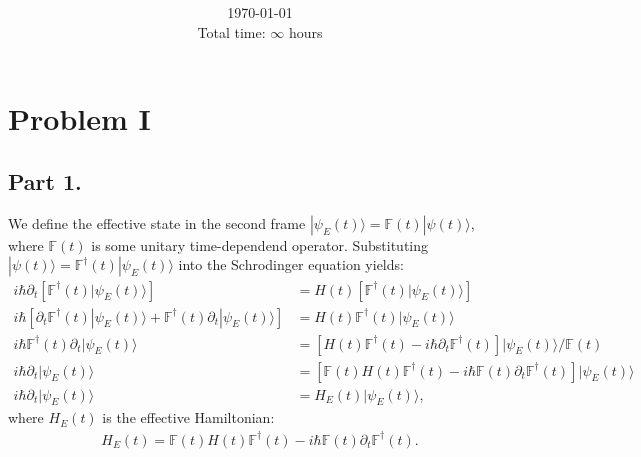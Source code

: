 \documentclass[letterpaper,11pt,twoside]{article}
\title{\textbf{\assignment}\\\course\\{\Large\institution}}
\author{\autor}
\date{\today\\Total time: $\infty$ hours}
\newcommand{\ket}[1]{|#1\rangle}
\begin{document}
\pagestyle{mainstyle}
\maketitle
\section*{Problem I}
%
\subsection*{Part 1.}
We define the effective state in the second frame $\ket{\psi_E(t)}=\mathbb{F}(t)\ket{\psi(t)}$, where $\mathbb{F}(t)$ is some unitary time-dependend operator.
Substituting $\ket{\psi(t)}=\mathbb{F}^\dagger(t)\ket{\psi_E(t)}$ into the Schrodinger equation yields:
\begin{align*}
  i\hbar\partial_t\left[\mathbb{F}^\dagger(t)\ket{\psi_E(t)}\right]&=H(t)\left[\mathbb{F}^\dagger(t)\ket{\psi_E(t)}\right]\\
  i\hbar\left[\partial_t\mathbb{F}^\dagger(t)\ket{\psi_E(t)}+\mathbb{F}^\dagger(t)\partial_t\ket{\psi_E(t)}\right]&=H(t)\mathbb{F}^\dagger(t)\ket{\psi_E(t)}\\
  i\hbar\mathbb{F}^\dagger(t)\partial_t\ket{\psi_E(t)}&=\left[H(t)\mathbb{F}^\dagger(t)-i\hbar\partial_t\mathbb{F}^\dagger(t)\right]\ket{\psi_E(t)}\biggr/\mathbb{F}(t)\\
  i\hbar\partial_t\ket{\psi_E(t)}&=\left[\mathbb{F}(t)H(t)\mathbb{F}^\dagger(t)-i\hbar\mathbb{F}(t)\partial_t\mathbb{F}^\dagger(t)\right]\ket{\psi_E(t)}\\
  i\hbar\partial_t\ket{\psi_E(t)}&=H_E(t)\ket{\psi_E(t)},
\end{align*}
where $H_E(t)$ is the effective Hamiltonian:
\begin{align*}
  H_E(t)=\mathbb{F}(t)H(t)\mathbb{F}^\dagger(t)-i\hbar\mathbb{F}(t)\partial_t\mathbb{F}^\dagger(t).
\end{align*}
%
\end{document}
